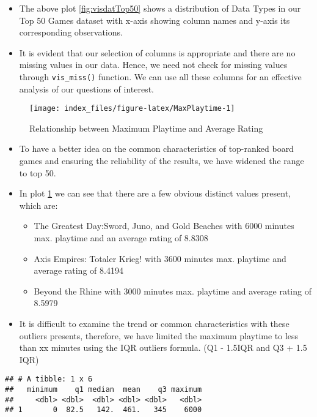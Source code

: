 \documentclass[
]{article}
\providecommand{\tightlist}{%
  \setlength{\itemsep}{0pt}\setlength{\parskip}{0pt}}
\begin{document}
\begin{itemize}
\item
  The above plot \ref{fig:visdatTop50} shows a distribution of Data Types in our Top 50 Games dataset with x-axis showing column names and y-axis its corresponding observations.
\item
  It is evident that our selection of columns is appropriate and there are no missing values in our data. Hence, we need not check for missing values through \texttt{vis\_miss()} function. We can use all these columns for an effective analysis of our questions of interest.
\end{itemize}

\begin{figure}[H]

{\centering \texttt{[image: index\_files/figure-latex/MaxPlaytime-1]} 

}

\caption{Relationship between Maximum Playtime and Average Rating}\label{fig:MaxPlaytime}
\end{figure}

\begin{itemize}
\item
  To have a better idea on the common characteristics of top-ranked board games and ensuring the reliability of the results, we have widened the range to top 50.
\item
  In plot \ref{fig:MaxPlaytime} we can see that there are a few obvious distinct values present, which are:

  \begin{itemize}
  \tightlist
  \item
    The Greatest Day:Sword, Juno, and Gold Beaches with 6000 minutes max. playtime and an average rating of 8.8308
  \item
    Axis Empires: Totaler Krieg! with 3600 minutes max. playtime and average rating of 8.4194
  \item
    Beyond the Rhine with 3000 minutes max. playtime and average rating of 8.5979
  \end{itemize}
\item
  It is difficult to examine the trend or common characteristics with these outliers presents, therefore, we have limited the maximum playtime to less than xx minutes using the IQR outliers formula. (Q1 - 1.5IQR and Q3 + 1.5 IQR)
\end{itemize}

\begin{verbatim}
## # A tibble: 1 x 6
##   minimum    q1 median  mean    q3 maximum
##     <dbl> <dbl>  <dbl> <dbl> <dbl>   <dbl>
## 1       0  82.5   142.  461.   345    6000
\end{verbatim}
\end{document}
